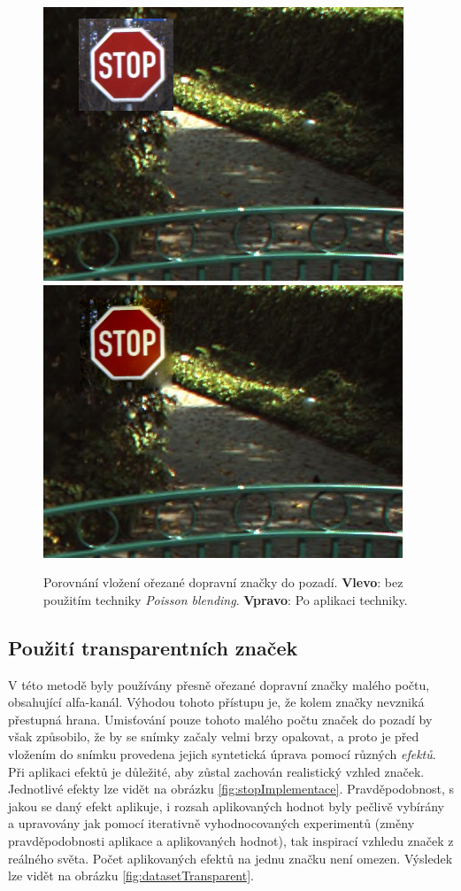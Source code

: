 \documentclass[czech]{ExcelAtFIT} %
\begin{document}
\begin{figure}[t]\centering
    \centering
    \includegraphics[width=0.49\linewidth]{images/stop_cropped.png}\hfill
    \includegraphics[width=0.49\linewidth]{images/stop_poisson.png}
    \caption{Porovnání vložení ořezané dopravní značky do pozadí. \textbf{Vlevo}: bez použitím techniky \emph{Poisson blending}. \textbf{Vpravo}: Po aplikaci techniky.}
    \label{fig:datasetCropped}
\end{figure}

\subsection{Použití transparentních značek}
V této metodě byly používány přesně ořezané dopravní značky malého počtu, obsahující alfa-kanál. Výhodou tohoto přístupu je, že kolem značky nevzniká přestupná hrana. Umisťování pouze tohoto malého počtu značek do pozadí by však způsobilo, že by se snímky začaly velmi brzy opakovat, a proto je před vložením do snímku provedena jejich syntetická úprava pomocí různých \emph{efektů}. Při aplikaci efektů je důležité, aby zůstal zachován realistický vzhled značek. Jednotlivé efekty lze vidět na obrázku \ref{fig:stopImplementace}.
Pravděpodobnost, s jakou se daný efekt aplikuje, i rozsah aplikovaných hodnot byly pečlivě vybírány a upravovány jak pomocí iterativně vyhodnocovaných experimentů (změny pravděpodobnosti aplikace a aplikovaných hodnot), tak inspirací vzhledu značek z reálného světa. Počet aplikovaných efektů na jednu značku není omezen. Výsledek lze vidět na obrázku \ref{fig:datasetTransparent}.
\end{document}
